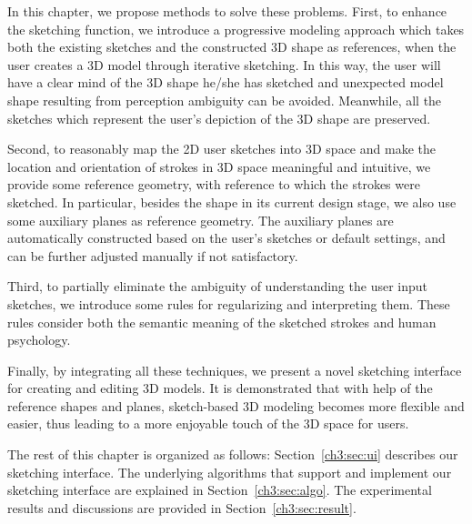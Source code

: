 In this chapter, we propose methods to solve  these problems. First,
to enhance the sketching function, we introduce a progressive
modeling approach which takes both the existing sketches and the
constructed 3D shape as references, when the user creates a 3D model
through iterative sketching. In this way, the user will have a clear
mind of the 3D shape he/she has sketched and unexpected model shape
resulting from perception ambiguity can be avoided. Meanwhile, all
the sketches which represent the user's depiction of the 3D shape
are preserved.

Second, to reasonably map the 2D user sketches into 3D space and
make the location and orientation of strokes in 3D space meaningful
and intuitive, we provide some reference geometry, with reference to
which the strokes were sketched. In particular, besides the shape in
its current design stage, we also use some auxiliary planes as
reference geometry. The auxiliary planes are automatically
constructed based on the user's sketches or default settings, and
can be further adjusted manually if not satisfactory.

Third, to partially eliminate the ambiguity of  understanding the
user input sketches, we introduce some rules for regularizing and
interpreting them. These rules consider both the semantic meaning of
the sketched strokes and human psychology.

Finally, by integrating all these techniques, we present a novel
sketching interface for creating and editing 3D models. It is
demonstrated that with help of the reference shapes and planes,
sketch-based 3D modeling becomes more flexible and easier, thus
leading to a more enjoyable touch of the 3D space for users.

The rest of this chapter is organized as follows:
Section~\ref{ch3:sec:ui} describes our sketching interface. The
underlying algorithms that support and implement our sketching
interface are explained in Section~\ref{ch3:sec:algo}. The
experimental results and discussions are provided in
Section~\ref{ch3:sec:result}.

